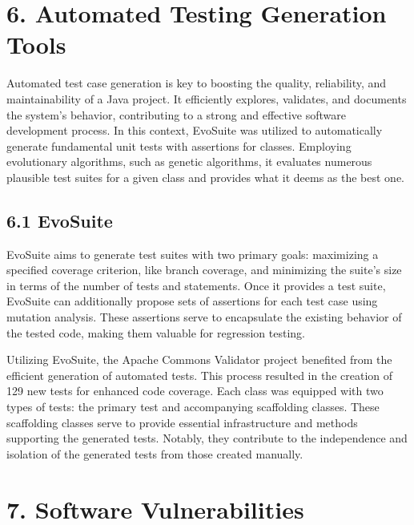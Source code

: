 \documentclass{sigchi}
\begin{document}
\section{6. Automated Testing Generation Tools}
Automated test case generation is key to boosting the quality, reliability, and maintainability of a Java project. It efficiently explores, validates, and documents the system's behavior, contributing to a strong and effective software development process.  In this context, EvoSuite was utilized to automatically generate fundamental unit tests with assertions for classes. Employing evolutionary algorithms, such as genetic algorithms, it evaluates numerous plausible test suites for a given class and provides what it deems as the best one.


\subsection{6.1 EvoSuite}
EvoSuite \cite{evosuite} aims to generate test suites with two primary goals: maximizing a specified coverage criterion, like branch coverage, and minimizing the suite's size in terms of the number of tests and statements. Once it provides a test suite, EvoSuite can additionally propose sets of assertions for each test case using mutation analysis. These assertions serve to encapsulate the existing behavior of the tested code, making them valuable for regression testing.

Utilizing EvoSuite, the Apache Commons Validator project benefited from the efficient generation of automated tests. This process resulted in the creation of 129 new tests for enhanced code coverage. Each class was equipped with two types of tests: the primary test and accompanying scaffolding classes. These scaffolding classes serve to provide essential infrastructure and methods supporting the generated tests. Notably, they contribute to the independence and isolation of the generated tests from those created manually.


\section{7. Software Vulnerabilities}
\end{document}
